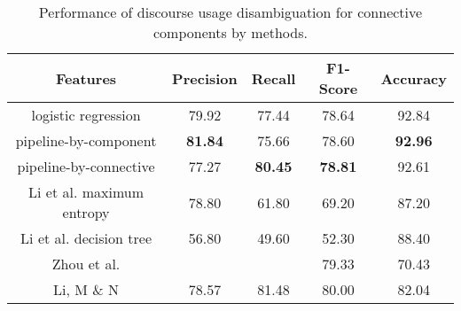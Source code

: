 \begin{table}[ht]
\centering
\begin{tabular}{|c|c|c|c|c|}
\hline

\bf Features                  & \bf Precision & \bf Recall & \bf F1-Score & \bf Accuracy \\ \hline
    logistic regression       &     79.92     &     77.44  &     78.64    &     92.84    \\ \hline
    pipeline-by-component     & \bf 81.84     &     75.66  &     78.60    & \bf 92.96    \\ \hline %
    pipeline-by-connective    &     77.27     & \bf 80.45  & \bf 78.81    &     92.61    \\

\hhline{|=|=|=|=|=|}

    Li et al. maximum entropy &     78.80     &     61.80  &     69.20    &     87.20    \\ \hline
    Li et al. decision tree   &     56.80     &     49.60  &     52.30    &     88.40    \\

\hhline{|=|=|=|=|=|}

    Zhou et al.               &               &            &     79.33    &     70.43    \\ \hline
    Li, M \& N                &     78.57     &     81.48  &     80.00    &     82.04    \\ \hline

\end{tabular}
\caption{\label{t:recognition-methods} Performance of discourse usage
disambiguation for connective components by methods. }
\end{table}
